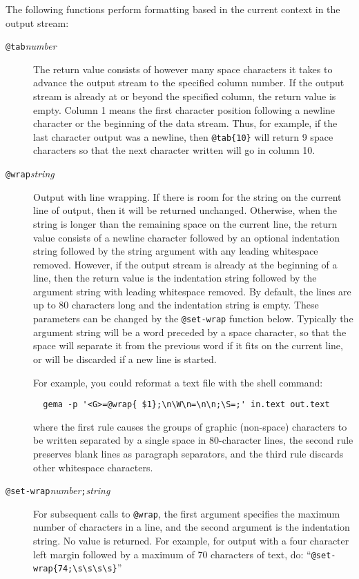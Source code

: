 The following functions perform formatting based in the current context
in the output stream:
\begin{description}
\item[{\tt @tab\ttlb}{\it number}{\tt \ttrb}]
The return value consists of however many space characters it
takes to advance the output stream to the specified column number.
If the output stream is already at or beyond the specified column, the return
value is empty.
Column 1 means the first character position following a newline
character or the beginning of the data stream.
Thus, for example, if the last character output was a newline, then
\verb/@tab{10}/ will return 9 space characters so that the next
character written will go in column 10.

\item[{\tt @wrap\ttlb}{\it string}{\tt \ttrb}]
Output with line wrapping.
If there is room for the string on the current line of output, then it
will be returned unchanged.  Otherwise, when the string is longer than
the remaining space on the current line, the return value consists of a
newline character followed by an optional indentation string followed by
the string argument with any leading
whitespace removed.  However, if the output stream is already at the
beginning of a line, then the return value is the indentation string
followed by the argument string with leading whitespace removed.
By default, the lines are up to 80 characters long
and the indentation string is empty.  These parameters can be changed by the
\verb/@set-wrap/ function below.
Typically the argument string will be a word preceded by a space
character, so that the space will separate it from the previous word if
it fits on the current line, or will be discarded if a new line is started.

For example, you could reformat a text file with the shell command:
\begin{verbatim}
  gema -p '<G>=@wrap{ $1};\n\W\n=\n\n;\S=;' in.text out.text
\end{verbatim}
where the first rule causes the groups of graphic (non-space) characters to be
written separated by a single space in 80-character lines, the second
rule preserves blank lines as paragraph separators, and the third rule
discards other whitespace characters.

\item[{\tt @set-wrap\ttlb}{\it number}{\tt ;}{\it string}{\tt \ttrb}]
For subsequent calls to \verb|@wrap|,
the first argument specifies the maximum number of characters in a line, and
the second argument is the indentation string.  No value is returned.
For example, for output with a four character left margin followed by a
maximum of 70 characters of text, do:  ``\verb/@set-wrap{74;\s\s\s\s}/''
\end{description}

